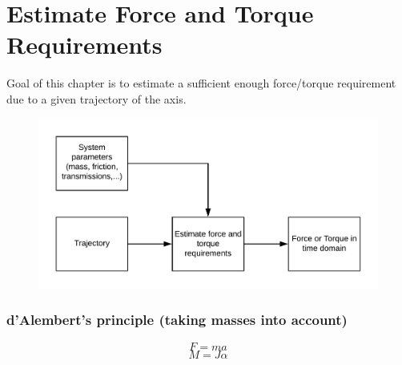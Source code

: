 \part{Estimate Force and Torque Requirements}	

	Goal of this chapter is to estimate a sufficient enough force/torque requirement due to a given trajectory of the axis.
	\begin{figure}[h!]
		\centering
		\includegraphics[width=0.5\linewidth]{./pics/forceTorque.png}
	\end{figure}

	\section{d'Alembert's principle (taking masses into account)}
	\[F=ma\]
	\[M=J \alpha \]

